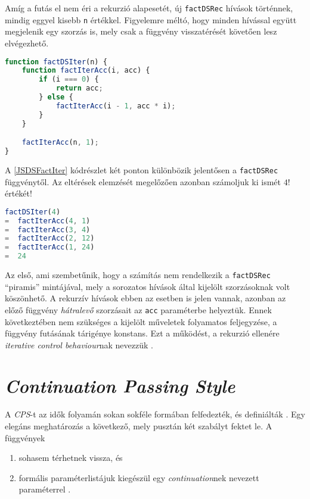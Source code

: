 Amíg a futás el nem éri a rekurzió alapesetét, új \texttt{factDSRec} hívások történnek, mindig eggyel kisebb \texttt{n} értékkel. Figyelemre méltó, hogy minden hívással együtt megjelenik egy szorzás is, mely csak a függvény visszatérését követően lesz elvégezhető.

\begin{lstlisting}[language=JavaScript, caption={\textit{Direct style} faktoriálist meghatározó függvény JavaScriptben}, captionpos=b, label=JSDSFactIter]
function factDSIter(n) {
    function factIterAcc(i, acc) {
        if (i === 0) {
            return acc;
        } else {
            factIterAcc(i - 1, acc * i);
        }
    }

    factIterAcc(n, 1);
}
\end{lstlisting}

A \ref{JSDSFactIter} kódrészlet két ponton különbözik jelentősen a \texttt{factDSRec} függvénytől. Az eltérések elemzését megelőzően azonban számoljuk ki ismét $4!$ értékét!

\begin{lstlisting}[language=JavaScript, caption={$4!$ kiszámítása \texttt{factDSIter} segítségével}, captionpos=b, numbers=none]
   factDSIter(4)
=  factIterAcc(4, 1)
=  factIterAcc(3, 4)
=  factIterAcc(2, 12)
=  factIterAcc(1, 24)
=  24
\end{lstlisting}

Az első, ami szembetűnik, hogy a számítás nem rendelkezik a \texttt{factDSRec} ``piramis'' mintájával, mely a sorozatos hívások által kijelölt szorzásoknak volt köszönhető. A rekurzív hívások ebben az esetben is jelen vannak, azonban az előző függvény \textit{hátralevő} szorzásait az \texttt{acc} paraméterbe helyeztük. Ennek következtében nem szükséges a kijelölt műveletek folyamatos feljegyzése, a függvény futásának tárigénye konstans. Ezt a működést, a rekurzió ellenére \textit{iterative control behaviour}nak nevezzük .

\section{\textit{Continuation Passing Style}}

A \textit{CPS}-t az idők folyamán sokan sokféle formában felfedezték, és definiálták \cite{Reynolds1993}. Egy elegáns meghatározás a következő, mely pusztán két szabályt fektet le. A függvények

\begin{enumerate}
    \item sohasem térhetnek vissza, és
    \item formális paraméterlistájuk kiegészül egy \textit{continuation}nek nevezett paraméterrel \cite{MightCPS}.
\end{enumerate}

